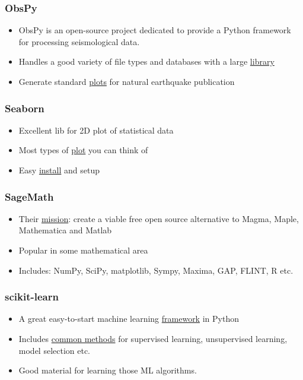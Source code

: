 \documentclass[compress]{beamer}
\begin{document}
\begin{frame}
	\frametitle{ObsPy}
	\begin{itemize}
		\item ObsPy is an open-source project dedicated to provide a Python framework for processing seismological data.
		\item Handles a good variety of file types and databases with a large \href{https://docs.obspy.org/packages/index.html}{library}
		\item Generate standard \href{https://docs.obspy.org/gallery.html}{plots} for natural earthquake publication 
	\end{itemize}
\end{frame}

\begin{frame}
	\frametitle{Seaborn}
	\begin{itemize}
		\item Excellent lib for 2D plot of statistical data
		\item Most types of \href{https://stanford.edu/~mwaskom/software/seaborn/examples/index.html}{plot} you can think of
		\item Easy \href{https://stanford.edu/~mwaskom/software/seaborn/installing.html}{install} and setup
	\end{itemize}
\end{frame}

\begin{frame}
	\frametitle{SageMath}
	\begin{itemize}
		\item Their \href{http://www.sagemath.org/}{mission}: create a viable free open source alternative to Magma, Maple, Mathematica and Matlab
		\item Popular in some mathematical area
		\item Includes: NumPy, SciPy, matplotlib, Sympy, Maxima, GAP, FLINT, R etc.
	\end{itemize}
\end{frame}

\begin{frame}
	\frametitle{scikit-learn}
	\begin{itemize}
		\item A great easy-to-start machine learning \href{http://scikit-learn.org/stable/index.html}{framework} in Python
		\item Includes \href{http://scikit-learn.org/stable/user\_guide.html}{common methods} for supervised learning, unsupervised learning, model selection etc. 
		\item Good material for learning those ML algorithms.
	\end{itemize}
\end{frame}
\end{document}
